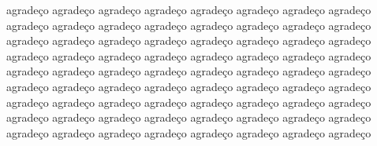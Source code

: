\begin{agradecimentos}

agradeço agradeço agradeço agradeço agradeço agradeço agradeço agradeço  agradeço agradeço agradeço agradeço agradeço agradeço agradeço agradeço agradeço agradeço agradeço agradeço agradeço agradeço agradeço agradeço agradeço agradeço agradeço agradeço agradeço agradeço agradeço agradeço agradeço agradeço agradeço agradeço agradeço agradeço agradeço agradeço agradeço agradeço agradeço agradeço agradeço agradeço agradeço agradeço agradeço agradeço agradeço agradeço agradeço agradeço agradeço agradeço agradeço agradeço agradeço agradeço agradeço agradeço agradeço agradeço agradeço agradeço agradeço agradeço agradeço agradeço agradeço agradeço 

\end{agradecimentos}